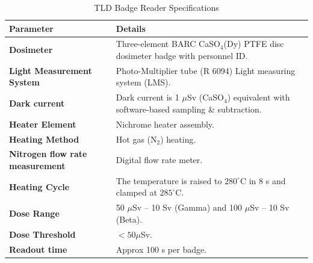 \begin{table}[H]
    \centering
    \caption{TLD Badge Reader Specifications}
    \begin{tabular}{|p{4.5cm}|p{10cm}|}
        \hline
        \textbf{Parameter} & \textbf{Details} \\
        \hline
        \textbf{Dosimeter} & Three-element BARC CaSO$_4$(Dy) PTFE disc dosimeter badge with personnel ID. \\
        \hline
        \textbf{Light Measurement System} & Photo-Multiplier tube (R 6094) Light measuring system (LMS). \\
        \hline
        \textbf{Dark current} & Dark current is 1 $\mu$Sv (CaSO$_4$) equivalent with software-based sampling \& subtraction. \\
        \hline
        \textbf{Heater Element} & Nichrome heater assembly. \\
        \hline
        \textbf{Heating Method} & Hot gas (N$_2$) heating. \\
        \hline
        \textbf{Nitrogen flow rate measurement} & Digital flow rate meter. \\
        \hline
        \textbf{Heating Cycle} & The temperature is raised to $280^\circ$C in 8 s and clamped at $285^\circ$C. \\
        \hline
        \textbf{Dose Range} & 50 $\mu$Sv -- 10 Sv (Gamma) and 100 $\mu$Sv -- 10 Sv (Beta). \\
        \hline
        \textbf{Dose Threshold} & $< 50 \mu$Sv. \\
        \hline
        \textbf{Readout time} & Approx 100 s per badge. \\
        \hline
    \end{tabular}
\end{table}

